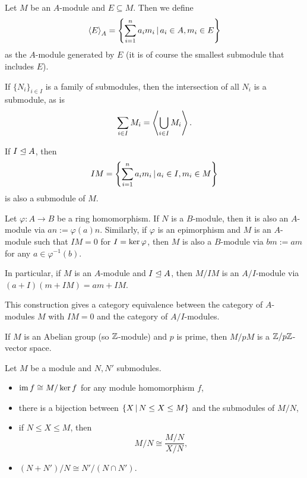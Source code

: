 Let $M$ be an $A$-module and $E \subseteq M$.
Then we define
\[
  \left< E \right>_A = \left\{
	\sum_{i=1}^n a_i m_i \,|\, a_i \in A, m_i \in E
  \right\}
\]
as the $A$-module generated by $E$ (it is of course the smallest submodule that
includes $E$).

If $\{N_i\}_{i\in I}$ is a family of submodules, then the intersection of all
$N_i$ is a submodule, as is
\[
  \sum_{i \in I} M_i = \left< \bigcup_{i \in I} M_i \right>.
\]

If $I \trianglelefteq A$, then
\[
  IM = \left\{
	\sum_{i=1}^n a_i m_i \,|\, a_i \in I, m_i \in M
  \right\}
\]
is also a submodule of $M$.

\begin{remark}
  Let $\varphi: A \to B$ be a ring homomorphism.
  If $N$ is a $B$-module, then it is also an $A$-module via $an := \varphi(a)
  n$.
  Similarly, if $\varphi$ is an epimorphism and $M$ is an $A$-module such that
  $IM = 0$ for $I = \operatorname{ker} \varphi$, then $M$ is also a $B$-module via $bm :=
  am$ for any $a \in \varphi^{-1}(b)$.
\end{remark}

\begin{remark}
  In particular, if $M$ is an $A$-module and $I \trianglelefteq A$, then $M /
  IM$ is an $A/I$-module via $(a+I)(m + IM) = am + IM$.
\end{remark}

\begin{remark}
  This construction gives a category equivalence between the category of
  $A$-modules $M$ with $IM = 0$ and the category of $A/I$-modules.
\end{remark}

\begin{example}
  If $M$ is an Abelian group (so $\mathbb{Z}$-module) and $p$ is prime, then $M/pM$ is a
  $\mathbb{Z}/p\mathbb{Z}$-vector space.
\end{example}

\begin{theorem}
  Let $M$ be a module and $N, N'$ submodules.
  \begin{itemize}
  \item $\operatorname{im} f \cong M / \operatorname{ker} f$ for any module homomorphism $f$,
  \item there is a bijection between $\{ X \,|\, N \le X \le M \}$ and the
	submodules of $M/N$,
  \item if $N \le X \le M$, then
	\[
	  M/N \cong \frac{M/N}{X/N},
	\]
  \item $(N + N')/N \cong N' / (N \cap N')$.
  \end{itemize}
\end{theorem}

